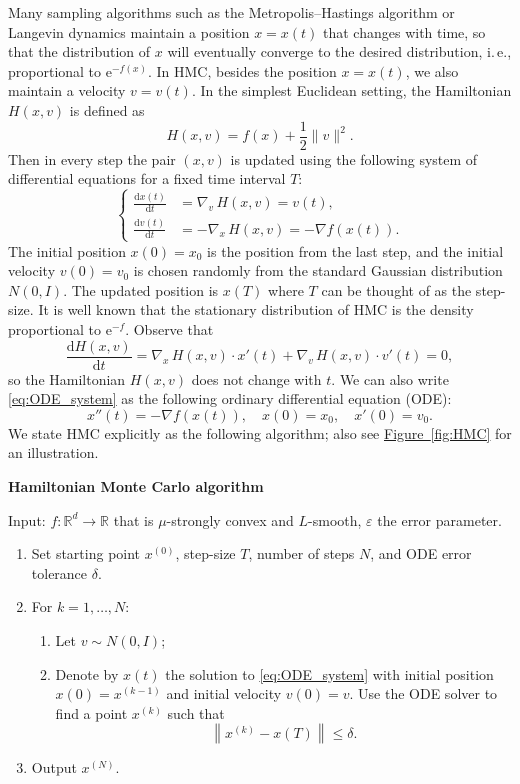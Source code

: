\documentclass[11pt]{article}
\numberwithin{equation}{section}
\theoremstyle{definition}
\theoremstyle{plain}
\newcommand{\R}{\mathbb R}
\newcommand{\eee}{\mathrm e}
\newcommand{\ie}{i.\,e.}
\newcommand{\expref}[2]{\hyperref[#2]{#1~\ref{#2}}}
\newcommand{\dif}{\mathrm{d}}
\newcommand{\norm}[1]{\left\lVert #1 \right\rVert}
\newcommand{\grad}{\nabla}
\newcommand{\eps}{\varepsilon}
\begin{document}
Many sampling algorithms such as the Metropolis--Hastings algorithm or Langevin dynamics maintain a position $x=x(t)$ that changes with time, so that the distribution of $x$ will eventually converge to the desired distribution, \ie, proportional to $\eee^{-f(x)}$.  
In HMC, besides the position $x=x(t)$, we also maintain a velocity $v=v(t)$. In the simplest Euclidean setting, the Hamiltonian $H(x,v)$ is defined as
\begin{equation}
%
H(x,v) = f(x) + \frac{1}{2} \|v\|^2.
\end{equation}
Then in every step the pair $(x,v)$ is updated using the following system of differential equations for a fixed time interval $T$:
\begin{equation}\label{eq:ODE_system}
\left\{
\begin{aligned}
\frac{\dif x(t)}{\dif t} &= \grad_v\, H(x,v)
%
= v(t),\\
\frac{\dif v(t)}{\dif t} &= -\grad_x\, H(x,v)
%
= -\grad f(x(t)).
\end{aligned}
\right.
\end{equation}
The initial position $x(0) = x_0$ is the position from the last step, and the initial velocity $v(0) = v_0$ is chosen randomly from the standard Gaussian distribution $N(0,I)$. The updated position is $x(T)$ where $T$ can be thought of as the step-size. 
It is %
well known  %
that the stationary distribution of HMC is the density proportional
to $\eee^{-f}$. 
Observe that 
\[
\frac{\dif H(x,v)}{\dif t} = 
%
\grad_x\, H(x,v) \cdot x'(t) + 
%
\grad_v\, H(x,v) \cdot v'(t) = 0, 
\] 
so the Hamiltonian $H(x,v)$ does not change with $t$. 
We can also write \eqref{eq:ODE_system} as the following ordinary differential equation (ODE):
\begin{equation}\label{eq:ODE_Ham}
x''(t) = -\grad f(x(t)), \quad x(0) = x_0, \quad x'(0) = v_0.
\end{equation}
We state HMC explicitly as the following algorithm; also see 
\expref{Figure}{fig:HMC} for an illustration.

\bigskip

\noindent
\textbf{Hamiltonian Monte Carlo algorithm}

\medskip
Input: $f:\R^d \to \R$ that is $\mu$-strongly convex and $L$-smooth, $\eps$ the error parameter.
\begin{enumerate}
	\item Set starting point $x^{(0)}$, step-size $T$, number of steps $N$, and ODE error tolerance $\delta$.
	\item For $k=1,\dots,N$:
	\begin{enumerate}
		\item Let $v \sim N(0,I)$;
		\item Denote by $x(t)$ the solution to \eqref{eq:ODE_system} with initial position $x(0) = x^{(k-1)}$ and initial velocity $v(0) = v$. Use the ODE solver to find a point $x^{(k)}$ such that
		\[
		\norm{x^{(k)} - x(T)} \le \delta.
		\] 
	\end{enumerate}
	\item Output $x^{(N)}$. 
\end{enumerate}
\end{document}
